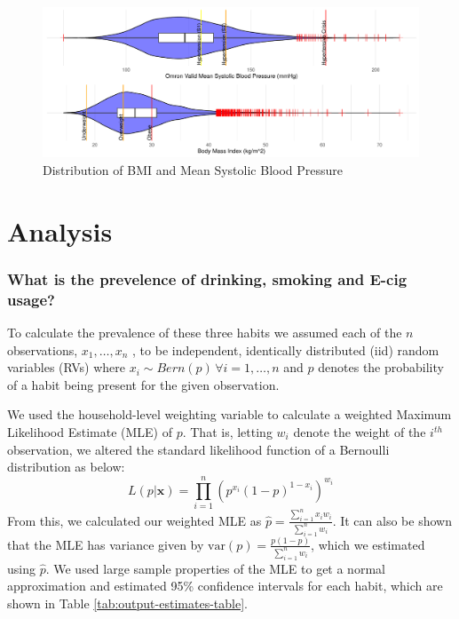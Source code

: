 \documentclass[
  11pt,
  twocolumn]{article}
\begin{document}
\begin{figure}[H]
\includegraphics{Coursework_files/figure-latex/output-distribution-plots-1} \caption{Distribution of BMI and Mean Systolic Blood Pressure}\label{fig:output-distribution-plots}
\end{figure}

\hypertarget{analysis}{%
\section{Analysis}\label{analysis}}

\hypertarget{what-is-the-prevelence-of-drinking-smoking-and-e-cig-usage}{%
\subsubsection{What is the prevelence of drinking, smoking and E-cig
usage?}\label{what-is-the-prevelence-of-drinking-smoking-and-e-cig-usage}}

To calculate the prevalence of these three habits we assumed each of the
\(n\) observations, \(x_1,…,x_n\) , to be independent, identically
distributed (iid) random variables (RVs) where
\(x_i \sim Bern(p)\, \forall i=1,…,n\) and \(p\) denotes the probability
of a habit being present for the given observation.

We used the household-level weighting variable to calculate a weighted
Maximum Likelihood Estimate (MLE) of \(p\). That is, letting \(w_i\)
denote the weight of the \(i^{th}\) observation, we altered the standard
likelihood function of a Bernoulli distribution as below:
\[L(p|\textbf{x}) = \prod_{i = 1}^{n} (p^{x_i}(1-p)^{1-x_i})^{w_i}\]
From this, we calculated our weighted MLE as
\(\widehat{p} = \frac{\sum_{i=1}^{n} x_iw_i}{\sum_{i=1}^{n} w_i}\). It
can also be shown that the MLE has variance given by
\(\text{var}(p)=\frac{p(1-p)}{\sum_{i=1}^{n}w_i}\), which we estimated
using \(\widehat{p}\). We used large sample properties of the MLE to get
a normal approximation and estimated 95\% confidence intervals for each
habit, which are shown in Table \ref{tab:output-estimates-table}.
\end{document}
